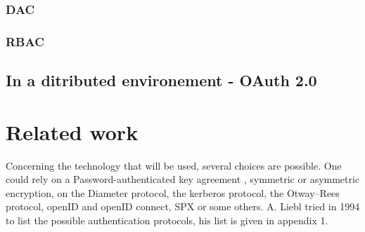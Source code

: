\subsubsection{DAC}
\subsubsection{RBAC}
\subsection{In a ditributed environement - OAuth 2.0}



\section{Related work}
Concerning the technology that will be used, several choices are possible. One could rely on a Password-authenticated key agreement \cite{Hao2011}\cite{Pointcheval2012}\cite{Juang2008}, symmetric or asymmetric encryption\cite{Woo1997}\cite{Denning1982}, on the Diameter protocol, the kerberos protocol\cite{Sundareswaran}, the Otway–Rees protocol, openID\cite{Ghazizadeh} and openID connect, SPX\cite{Tardo1991} or some others. A. Liebl tried in 1994 to list the possible authentication protocols, his list is given in appendix 1.
